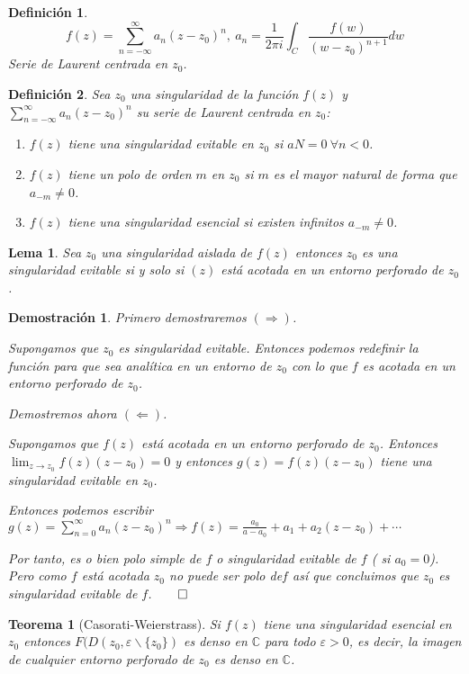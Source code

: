 \documentclass[10pt]{book}
\newtheorem{defi}{Definición}[chapter]
\newtheorem{theorem}{Teorema}[chapter]
\newtheorem*{dem}{Demostración}
\newtheorem{lema}{Lema}[chapter]
\newcommand{\C}{\mathbb{C}}
\begin{document}
\begin{defi}
$$f(z) = \sum_{n= -\infty}^{\infty} a_n (z-z_0)^n,\ a_n = \frac{1}{2\pi i} \int_C \frac{f(w)}{(w-z_0)^{n+1}}dw$$
Serie de Laurent centrada en $z_0$.
\end{defi}

\begin{defi}
Sea $z_0$ una singularidad de la función $f(z)$ y $\sum_{n= -\infty}^{\infty} a_n (z-z_0)^n$ su serie de Laurent centrada en $z_0$:
\begin{enumerate}
\item $f(z)$ tiene una singularidad evitable en $z_0$ si $aN=0\ \forall n<0$.
\item $f(z)$ tiene un polo de orden $m$ en $z_0$ si $m$ es el mayor natural de forma que $a_{-m}\neq 0$.
\item $f(z)$ tiene una singularidad esencial si existen infinitos $a_{-m}\neq 0$. 
\end{enumerate}
\end{defi}

\begin{lema}
Sea $z_0$ una singularidad aislada de $f(z)$ entonces $z_0$ es una singularidad evitable si y solo si $(z)$ está acotada en un entorno perforado de $z_0$.
\end{lema}

\begin{dem}
Primero demostraremos $(\Rightarrow)$.

Supongamos que $z_0$ es singularidad evitable. Entonces podemos redefinir la función para que sea analítica en un entorno de $z_0$ con lo que $f$ es acotada en un entorno perforado de $z_0$.

Demostremos ahora $(\Leftarrow)$.

Supongamos que $f(z)$ está acotada en un entorno perforado de $z_0$. Entonces $\lim_{z\to z_0} f(z)(z-z_0) =0$ y entonces $g(z) = f(z)(z-z_0)$ tiene una singularidad evitable en $z_0$.

Entonces podemos escribir $g(z) = \sum_{n=0}^\infty a_n (z-z_0)^n \Rightarrow f(z) = \frac{a_0}{a-a_0} + a_1 + a_2(z-z_0)+\cdots$

Por tanto, es o bien polo simple de $f$ o singularidad evitable de $f$ ( si $a_0=0$). Pero como $f$ está acotada $z_0$ no puede ser polo de$f$ así que concluimos que $z_0$ es singularidad evitable de $f$.$\qed$
\end{dem}


\begin{theorem}[Casorati-Weierstrass]
Si $f(z)$ tiene una singularidad esencial en $z_0$ entonces $F(D(z_0,\varepsilon\backslash\{z_0\})$ es denso en $\C$ para  todo $\varepsilon>0$, es decir, la imagen de cualquier entorno perforado de $z_0$ es denso en $\C$.
\end{theorem}
\end{document}
